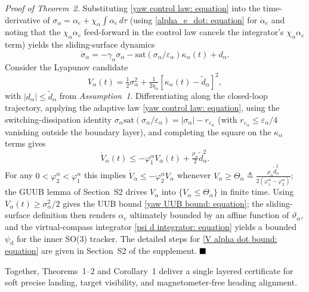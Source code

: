 \textit{Proof of Theorem~2.} Substituting \eqref{yaw control law: equation} into the time-derivative of $\sigma_\alpha=\alpha_e+\chi_\alpha\!\int\alpha_e\,d\tau$ (using \eqref{alpha_e_dot: equation} for $\dot\alpha_e$ and noting that the $\chi_\alpha\alpha_e$ feed-forward in the control law cancels the integrator's $\chi_\alpha\alpha_e$ term) yields the sliding-surface dynamics
\begin{equation} \label{yaw sigma dynamics: equation}
    \dot{\sigma}_\alpha = -\gamma_\alpha\sigma_\alpha - \text{sat}(\sigma_\alpha/\varepsilon_\alpha)\kappa_\alpha(t) + d_\alpha.
\end{equation}
Consider the Lyapunov candidate
\begin{equation} \label{V alpha candidate: equation}
    V_\alpha(t) = \tfrac{1}{2}\sigma_\alpha^2 + \tfrac{1}{2\eta_\alpha}[\kappa_\alpha(t)-\tilde{d}_\alpha]^2,
\end{equation}
with $|d_\alpha|\le\tilde{d}_\alpha$ from \textit{Assumption~1}. Differentiating along the closed-loop trajectory, applying the adaptive law \eqref{yaw control law: equation}, using the switching-dissipation identity $\sigma_\alpha\text{sat}(\sigma_\alpha/\varepsilon_\alpha)=|\sigma_\alpha|-r_{\varepsilon_\alpha}$ (with $r_{\varepsilon_\alpha}\le\varepsilon_\alpha/4$ vanishing outside the boundary layer), and completing the square on the $\kappa_\alpha$ terms gives
\begin{equation} \label{V alpha dot bound: equation}
    \dot{V}_\alpha(t) \le -\varphi_1^\alpha V_\alpha(t) + \tfrac{\rho_\alpha}{2}\tilde{d}_\alpha^2.
\end{equation}
For any $0<\varphi_2^\alpha<\varphi_1^\alpha$ this implies $\dot{V}_\alpha\le-\varphi_2^\alpha V_\alpha$ whenever $V_\alpha\ge\Theta_\alpha\triangleq\tfrac{\rho_\alpha\tilde{d}_\alpha^2}{2(\varphi_1^\alpha-\varphi_2^\alpha)}$; the GUUB lemma of Section~S2 drives $V_\alpha$ into $\{V_\alpha\le\Theta_\alpha\}$ in finite time. Using $V_\alpha(t)\ge\sigma_\alpha^2/2$ gives the UUB bound \eqref{yaw UUB bound: equation}; the sliding-surface definition then renders $\alpha_e$ ultimately bounded by an affine function of $\vartheta_\alpha$, and the virtual-compass integrator \eqref{psi d integrator: equation} yields a bounded $\psi_\text{d}$ for the inner SO(3) tracker. The detailed steps for \eqref{V alpha dot bound: equation} are given in Section~S2 of the supplement. $\hfill\blacksquare$

Together, Theorems~1--2 and Corollary~1 deliver a single layered certificate for soft precise landing, target visibility, and magnetometer-free heading alignment.
